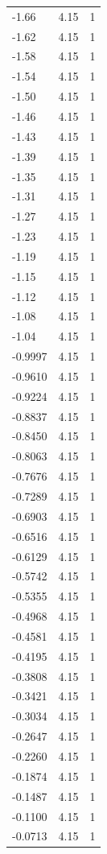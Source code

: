 \begin{longtable}{lrr}
  -1.66 & 4.15 & 1 \\
  -1.62 & 4.15 & 1 \\
  -1.58 & 4.15 & 1 \\
  -1.54 & 4.15 & 1 \\
  -1.50 & 4.15 & 1 \\
  -1.46 & 4.15 & 1 \\
  -1.43 & 4.15 & 1 \\
  -1.39 & 4.15 & 1 \\
  -1.35 & 4.15 & 1 \\
  -1.31 & 4.15 & 1 \\
  -1.27 & 4.15 & 1 \\
  -1.23 & 4.15 & 1 \\
  -1.19 & 4.15 & 1 \\
  -1.15 & 4.15 & 1 \\
  -1.12 & 4.15 & 1 \\
  -1.08 & 4.15 & 1 \\
  -1.04 & 4.15 & 1 \\
  -0.9997 & 4.15 & 1 \\
  -0.9610 & 4.15 & 1 \\
  -0.9224 & 4.15 & 1 \\
  -0.8837 & 4.15 & 1 \\
  -0.8450 & 4.15 & 1 \\
  -0.8063 & 4.15 & 1 \\
  -0.7676 & 4.15 & 1 \\
  -0.7289 & 4.15 & 1 \\
  -0.6903 & 4.15 & 1 \\
  -0.6516 & 4.15 & 1 \\
  -0.6129 & 4.15 & 1 \\
  -0.5742 & 4.15 & 1 \\
  -0.5355 & 4.15 & 1 \\
  -0.4968 & 4.15 & 1 \\
  -0.4581 & 4.15 & 1 \\
  -0.4195 & 4.15 & 1 \\
  -0.3808 & 4.15 & 1 \\
  -0.3421 & 4.15 & 1 \\
  -0.3034 & 4.15 & 1 \\
  -0.2647 & 4.15 & 1 \\
  -0.2260 & 4.15 & 1 \\
  -0.1874 & 4.15 & 1 \\
  -0.1487 & 4.15 & 1 \\
  -0.1100 & 4.15 & 1 \\
  -0.0713 & 4.15 & 1 \\

\end{longtable}

